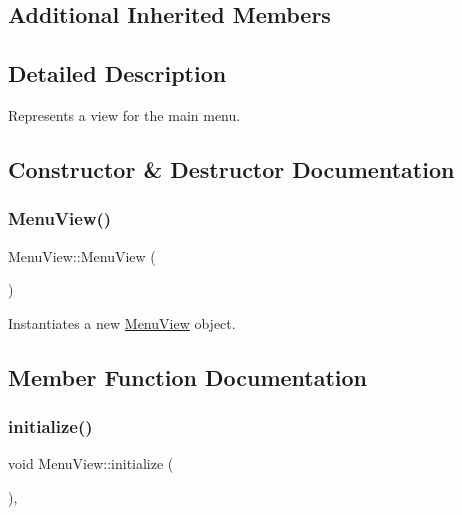 \subsection*{Additional Inherited Members}


\subsection{Detailed Description}
Represents a view for the main menu. 



\subsection{Constructor \& Destructor Documentation}
\mbox{\label{class_menu_view_a56e295d58afed820591daa0fc49d3b8a}} 
\subsubsection{\texorpdfstring{MenuView()}{MenuView()}}
{\footnotesize\ttfamily Menu\+View\+::\+Menu\+View (\begin{DoxyParamCaption}{ }\end{DoxyParamCaption})}



Instantiates a new \mbox{\hyperlink{class_menu_view}{Menu\+View}} object. 



\subsection{Member Function Documentation}
\mbox{\label{class_menu_view_afeb1445373870a755eea4fe036351ba4}} 
\subsubsection{\texorpdfstring{initialize()}{initialize()}}
{\footnotesize\ttfamily void Menu\+View\+::initialize (\begin{DoxyParamCaption}{ }\end{DoxyParamCaption})\hspace{0.3cm}{\ttfamily [override]}, {\ttfamily [virtual]}}



